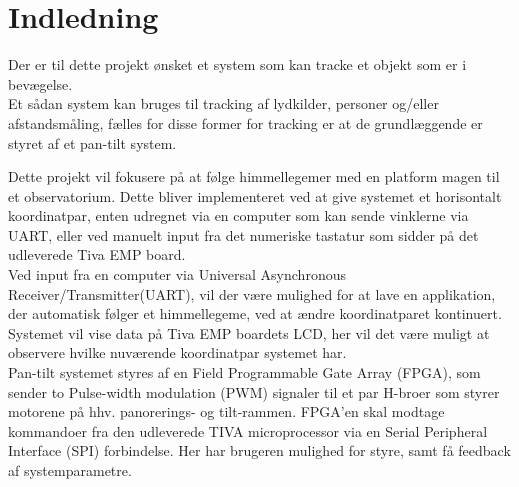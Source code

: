 \section{Indledning}
Der er til dette projekt ønsket et system som kan tracke et objekt som er i bevægelse.\\
Et sådan system kan bruges til tracking af lydkilder, personer og/eller afstandsmåling, fælles for disse former for tracking er at de grundlæggende er styret af et pan-tilt system.

Dette projekt vil fokusere på at følge himmellegemer med en platform magen til et observatorium. Dette bliver implementeret ved at give systemet et horisontalt koordinatpar, enten udregnet via en computer som kan sende vinklerne via UART, eller ved manuelt input fra det numeriske tastatur som sidder på det udleverede Tiva EMP board.\\
Ved input fra en computer via Universal Asynchronous Receiver/Transmitter(UART), vil der være mulighed for at lave en applikation, der automatisk følger et himmellegeme, ved at ændre koordinatparet kontinuert.
Systemet vil vise data på Tiva EMP boardets LCD, her vil det være muligt at observere hvilke nuværende koordinatpar systemet har.\\

Pan-tilt systemet styres af en Field Programmable Gate Array (FPGA), som sender to Pulse-width modulation (PWM) signaler til et par H-broer som styrer motorene på hhv. panorerings- og tilt-rammen.
FPGA’en skal modtage kommandoer fra den udleverede TIVA microprocessor via en Serial Peripheral Interface (SPI) forbindelse.
Her har brugeren mulighed for styre, samt få feedback af systemparametre.